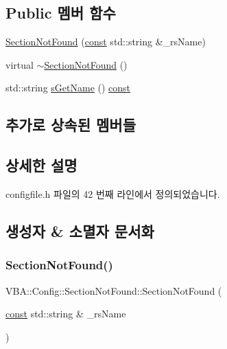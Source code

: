 \subsection*{Public 멤버 함수}
\begin{DoxyCompactItemize}
\item 
\mbox{\hyperlink{class_v_b_a_1_1_config_1_1_section_not_found_aeb897a2e04241f06da0bb12a972e65ff}{Section\+Not\+Found}} (\mbox{\hyperlink{getopt1_8c_a2c212835823e3c54a8ab6d95c652660e}{const}} std\+::string \&\+\_\+rs\+Name)
\item 
virtual \mbox{\hyperlink{class_v_b_a_1_1_config_1_1_section_not_found_a5a9097bde0f3bb2bf24afc2a07672b65}{$\sim$\+Section\+Not\+Found}} ()
\item 
std\+::string \mbox{\hyperlink{class_v_b_a_1_1_config_1_1_section_not_found_a0c718b305a09b59b4887654f24a218c9}{s\+Get\+Name}} () \mbox{\hyperlink{getopt1_8c_a2c212835823e3c54a8ab6d95c652660e}{const}}
\end{DoxyCompactItemize}
\subsection*{추가로 상속된 멤버들}


\subsection{상세한 설명}


configfile.\+h 파일의 42 번째 라인에서 정의되었습니다.



\subsection{생성자 \& 소멸자 문서화}
\mbox{\label{class_v_b_a_1_1_config_1_1_section_not_found_aeb897a2e04241f06da0bb12a972e65ff}} 
\subsubsection{\texorpdfstring{Section\+Not\+Found()}{SectionNotFound()}}
{\footnotesize\ttfamily V\+B\+A\+::\+Config\+::\+Section\+Not\+Found\+::\+Section\+Not\+Found (\begin{DoxyParamCaption}\item[{\mbox{\hyperlink{getopt1_8c_a2c212835823e3c54a8ab6d95c652660e}{const}} std\+::string \&}]{\+\_\+rs\+Name }\end{DoxyParamCaption})\hspace{0.3cm}{\ttfamily [inline]}}



